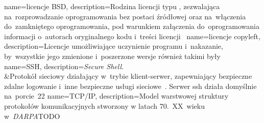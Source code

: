 {
	name={licencje BSD},
	description={Rodzina licencji typu , zezwalająca na~rozprowadzanie oprogramowania bez postaci źródłowej oraz na~włączenia do~zamkniętego oprogramowania, pod warunkiem załączenia do~oprogramowania informacji o~autorach oryginalnego kodu i~treści licencji~\cite{bsd,wiki:licenses-comparison}}
}
{
	name={licencje copyleft},
	description={Licencje umożliwiające uczynienie programu  i~nakazanie, by~wszystkie jego zmienione i~poszerzone wersje również takimi były~\cite{copyleft,wiki:licenses-comparison}}
}
{
	name={SSH},
	description={\emph{Secure Shell}.\\&Protokół sieciowy działający w~trybie klient-serwer, zapewniający bezpieczne zdalne logowanie i~inne bezpieczne usługi sieciowe~\cite{rfc:ssh}. Serwer \gls{ssh} działa domyślnie na~porcie~22}
}
{
	name={TCP/IP},
	description={Model warstwowej struktury protokołów komunikacyjnych stworzony w latach 70.~XX~wieku w~\emph{DARPA}TODO}
}
